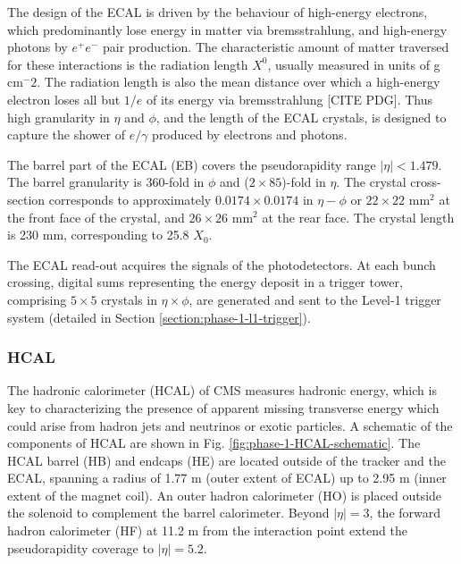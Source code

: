 \documentclass{article}
\begin{document}
The design of the ECAL is driven by the behaviour of high-energy electrons, which predominantly lose energy in matter via bremsstrahlung, and high-energy photons by $e^+ e^-$ pair production. The characteristic amount of matter traversed for these interactions is the radiation length $X^0$, usually measured in units of g cm$^-2$. The radiation length is also the mean distance over which a high-energy electron loses all but $1/e$ of its energy via bremsstrahlung [CITE PDG]. Thus high granularity in $\eta$ and $\phi$, and the length of the ECAL crystals, is designed to capture the shower of $e/\gamma$ produced by electrons and photons.

The barrel part of the ECAL (EB) covers the pseudorapidity range $|\eta| < 1.479$. The barrel granularity is 360-fold in $\phi$ and ($2 \times 85$)-fold in $\eta$. The crystal cross-section corresponds to approximately $0.0174 \times 0.0174$ in $\eta-\phi$ or $22 \times 22$ mm$^2$ at the front face of the crystal, and $26 \times 26$ mm$^2$ at the rear face. The crystal length is 230 mm, corresponding to 25.8 $X_0$.

The ECAL read-out acquires the signals of the photodetectors. At each bunch crossing, digital sums representing the energy deposit in a trigger tower, comprising $5 \times 5$ crystals in $\eta \times \phi$, are generated and sent to the Level-1 trigger system (detailed in Section \ref{section:phase-1-l1-trigger}).

\subsubsection{HCAL}
The hadronic calorimeter (HCAL) of CMS measures hadronic energy, which is key to characterizing the presence of apparent missing transverse energy which could arise from hadron jets and neutrinos or exotic particles. A schematic of the components of HCAL are shown in Fig. \ref{fig:phase-1-HCAL-schematic}. The HCAL barrel (HB) and endcaps (HE) are located outside of the tracker and the ECAL, spanning a radius of 1.77 m (outer extent of ECAL) up to 2.95 m (inner extent of the magnet coil). An outer hadron calorimeter (HO) is placed outside the solenoid to complement the barrel calorimeter. Beyond $|\eta| = 3$, the forward hadron calorimeter (HF) at 11.2 m from the interaction point extend the pseudorapidity coverage to $|\eta| = 5.2$.
\end{document}
